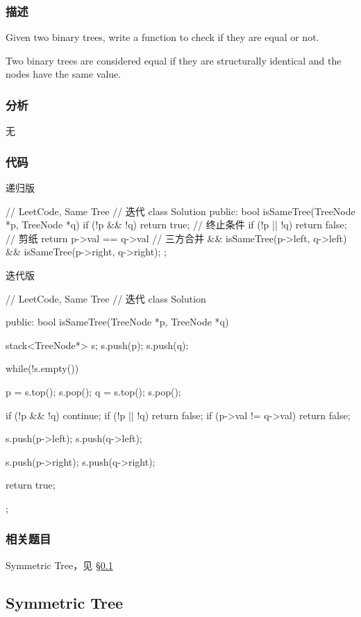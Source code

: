 \subsubsection{描述}
Given two binary trees, write a function to check if they are equal or not.

Two binary trees are considered equal if they are structurally identical and the nodes have the same value.


\subsubsection{分析}
无


\subsubsection{代码}
递归版
\begin{Code}
// LeetCode, Same Tree
// 迭代
class Solution {
public:
    bool isSameTree(TreeNode *p, TreeNode *q) {
        if (!p && !q) return true;   // 终止条件
        if (!p || !q) return false;  // 剪纸
        return p->val == q->val      // 三方合并
                && isSameTree(p->left, q->left)
                && isSameTree(p->right, q->right);
    }
};
\end{Code}

迭代版
\begin{Code}
// LeetCode, Same Tree
// 迭代
class Solution {
public:
    bool isSameTree(TreeNode *p, TreeNode *q) {
        stack<TreeNode*> s;
        s.push(p);
        s.push(q);

        while(!s.empty()) {
            p = s.top(); s.pop();
            q = s.top(); s.pop();

            if (!p && !q) continue;
            if (!p || !q) return false;
            if (p->val != q->val) return false;

            s.push(p->left);
            s.push(q->left);

            s.push(p->right);
            s.push(q->right);
        }
        return true;
    }
};
\end{Code}


\subsubsection{相关题目}
\begindot
\item Symmetric Tree，见 \S \ref{sec:symmetric-tree}
\myenddot


\subsection{Symmetric Tree}
\label{sec:symmetric-tree}


